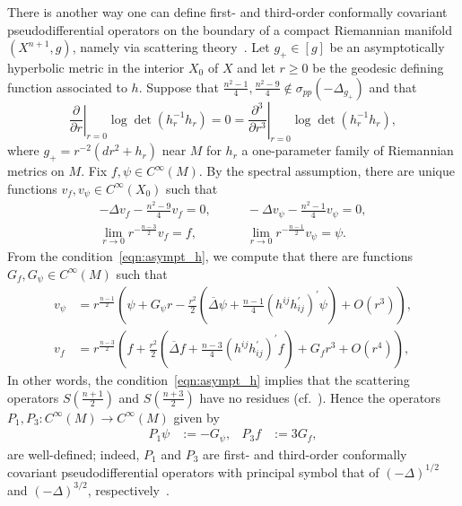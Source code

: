 \documentclass{amsart}
\theoremstyle{definition}
\theoremstyle{remark}
\numberwithin{equation}{section}
\begin{document}
There is another way one can define first- and third-order conformally covariant pseudodifferential operators on the boundary of a compact Riemannian manifold $(X^{n+1},g)$, namely via scattering theory~\cite{GrahamZworski2003}.  Let $g_+\in[g]$ be an asymptotically hyperbolic metric in the interior $X_0$ of $X$ and let $r\geq0$ be the geodesic defining function associated to $h$.  Suppose that $\frac{n^2-1}{4},\frac{n^2-9}{4}\not\in\sigma_{pp}(-\Delta_{g_+})$ and that
\begin{equation}
 \label{eqn:asympt_h}
 \left.\frac{\partial}{\partial r}\right|_{r=0}\log\det(h_r^{-1}h_r) = 0 = \left.\frac{\partial^3}{\partial r^3}\right|_{r=0}\log\det(h_r^{-1}h_r) ,
\end{equation}
where $g_+=r^{-2}(dr^2+h_r)$ near $M$ for $h_r$ a one-parameter family of Riemannian metrics on $M$.  Fix $f,\psi\in C^\infty(M)$.  By the spectral assumption, there are unique functions $v_f,v_\psi\in C^\infty(X_0)$ such that
\begin{equation}
 \label{eqn:poisson}
 \begin{split}
  -\Delta v_f - \frac{n^2-9}{4}v_f = 0,& \qquad -\Delta v_\psi - \frac{n^2-1}{4}v_\psi = 0, \\
  \lim_{r\to 0} r^{-\frac{n-3}{2}}v_f = f, & \qquad \lim_{r\to 0} r^{-\frac{n-1}{2}}v_\psi = \psi .
 \end{split}
\end{equation}
From the condition~\eqref{eqn:asympt_h}, we compute that there are functions $G_f,G_\psi\in C^\infty(M)$ such that
\begin{align}
 \label{eqn:asympt_P1} v_\psi & = r^{\frac{n-1}{2}}\left(\psi + G_\psi r - \frac{r^2}{2}\left({\overline{\Delta}}\psi + \frac{n-1}{4}(h^{ij}h_{ij}^\prime)^\prime\psi \right) + O(r^3) \right) , \\
 \label{eqn:asympt_P3} v_f & = r^{\frac{n-3}{2}}\left(f + \frac{r^2}{2}\left({\overline{\Delta}} f + \frac{n-3}{4}(h^{ij}h_{ij}^\prime)^\prime f\right) + G_f r^3 + O(r^4) \right) ,
\end{align}
In other words, the condition~\eqref{eqn:asympt_h} implies that the scattering operators $S\left(\frac{n+1}{2}\right)$ and $S\left(\frac{n+3}{2}\right)$ have no residues (cf.\ \cite{GrahamZworski2003,GuillarmouGuillope2007}).  Hence the operators $P_1,P_3\colon C^\infty(M)\to C^\infty(M)$ given by
\begin{align*}
 P_1\psi & := -G_\psi, & P_3f & := 3G_f ,
\end{align*}
are well-defined; indeed, $P_1$ and $P_3$ are first- and third-order conformally covariant pseudodifferential operators with principal symbol that of $(-\Delta)^{1/2}$ and $(-\Delta)^{3/2}$, respectively~\cite{GrahamZworski2003}.
\end{document}
